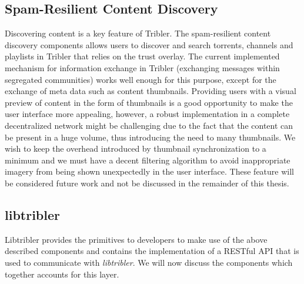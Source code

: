 \subsection{Spam-Resilient Content Discovery}
Discovering content is a key feature of Tribler. The spam-resilient content discovery components allows users to discover and search torrents, channels and playlists in Tribler that relies on the trust overlay. The current implemented mechanism for information exchange in Tribler (exchanging messages within segregated communities) works well enough for this purpose, except for the exchange of meta data such as content thumbnails. Providing users with a visual preview of content in the form of thumbnails is a good opportunity to make the user interface more appealing, however, a robust implementation in a complete decentralized network might be challenging due to the fact that the content can be present in a huge volume, thus introducing the need to many thumbnails. We wish to keep the overhead introduced by thumbnail synchronization to a minimum and we must have a decent filtering algorithm to avoid inappropriate imagery from being shown unexpectedly in the user interface. These feature will be considered future work and not be discussed in the remainder of this thesis.

\subsection{libtribler}
Libtribler provides the primitives to developers to make use of the above described components and contains the implementation of a RESTful API that is used to communicate with \emph{libtribler}. We will now discuss the components which together accounts for this layer.

